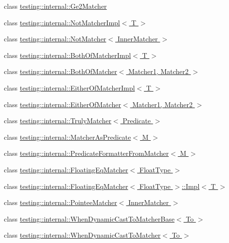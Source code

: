 \begin{DoxyCompactItemize}
\item 
class \hyperlink{classtesting_1_1internal_1_1_ge2_matcher}{testing\+::internal\+::\+Ge2\+Matcher}
\item 
class \hyperlink{classtesting_1_1internal_1_1_not_matcher_impl}{testing\+::internal\+::\+Not\+Matcher\+Impl$<$ T $>$}
\item 
class \hyperlink{classtesting_1_1internal_1_1_not_matcher}{testing\+::internal\+::\+Not\+Matcher$<$ Inner\+Matcher $>$}
\item 
class \hyperlink{classtesting_1_1internal_1_1_both_of_matcher_impl}{testing\+::internal\+::\+Both\+Of\+Matcher\+Impl$<$ T $>$}
\item 
class \hyperlink{classtesting_1_1internal_1_1_both_of_matcher}{testing\+::internal\+::\+Both\+Of\+Matcher$<$ Matcher1, Matcher2 $>$}
\item 
class \hyperlink{classtesting_1_1internal_1_1_either_of_matcher_impl}{testing\+::internal\+::\+Either\+Of\+Matcher\+Impl$<$ T $>$}
\item 
class \hyperlink{classtesting_1_1internal_1_1_either_of_matcher}{testing\+::internal\+::\+Either\+Of\+Matcher$<$ Matcher1, Matcher2 $>$}
\item 
class \hyperlink{classtesting_1_1internal_1_1_truly_matcher}{testing\+::internal\+::\+Truly\+Matcher$<$ Predicate $>$}
\item 
class \hyperlink{classtesting_1_1internal_1_1_matcher_as_predicate}{testing\+::internal\+::\+Matcher\+As\+Predicate$<$ M $>$}
\item 
class \hyperlink{classtesting_1_1internal_1_1_predicate_formatter_from_matcher}{testing\+::internal\+::\+Predicate\+Formatter\+From\+Matcher$<$ M $>$}
\item 
class \hyperlink{classtesting_1_1internal_1_1_floating_eq_matcher}{testing\+::internal\+::\+Floating\+Eq\+Matcher$<$ Float\+Type $>$}
\item 
class \hyperlink{classtesting_1_1internal_1_1_floating_eq_matcher_1_1_impl}{testing\+::internal\+::\+Floating\+Eq\+Matcher$<$ Float\+Type $>$\+::\+Impl$<$ T $>$}
\item 
class \hyperlink{classtesting_1_1internal_1_1_pointee_matcher}{testing\+::internal\+::\+Pointee\+Matcher$<$ Inner\+Matcher $>$}
\item 
class \hyperlink{classtesting_1_1internal_1_1_when_dynamic_cast_to_matcher_base}{testing\+::internal\+::\+When\+Dynamic\+Cast\+To\+Matcher\+Base$<$ To $>$}
\item 
class \hyperlink{classtesting_1_1internal_1_1_when_dynamic_cast_to_matcher}{testing\+::internal\+::\+When\+Dynamic\+Cast\+To\+Matcher$<$ To $>$}

\end{DoxyCompactItemize}
